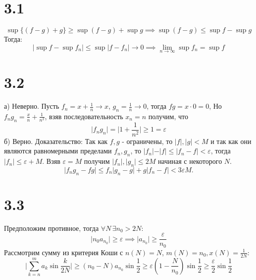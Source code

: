 \documentclass[12pt]{article}
\begin{document}
\section{3.1}
\[
    \sup \{(f - g) + g\} \geq \sup (f - g) + \sup g \implies \sup (f - g) \leq \sup f - \sup g
\]  
Тогда: 
\[
    \vert \sup f - \sup f_n \vert \leq \sup \vert f - f_n \vert \to 0 \implies \lim_{n \to \infty} \sup f_n = \sup f
\] 


\section{3.2}
а) Неверно. Пусть $f_n = x + \frac{1}{n} \to x$, $g_n = \frac{1}{n} \to 0$, тогда $f g = x \cdot 0 = 0$, 
Но $f_n g_n = \frac{x}{n} + \frac{1}{n^2}$, взяв последовательность $x_n = n$ получим, что 
\[
    \vert f_n g_n \vert = \vert 1 + \frac{1}{n^2} \vert \geq 1 = \varepsilon   
\]     
б) Верно. Доказательство: 
Так как $f, g$ - ограничены, то $\vert f \vert, \vert g \vert < M$ и так как они являются равномерными 
пределами $f_n, g_n$, то $\vert f_n \vert - \vert f \vert \leq \vert f_n - f \vert < \varepsilon$, тогда 
$\vert f_n \vert \leq \varepsilon + M$. Взяв $\varepsilon = M$ получим $\vert f_n \vert, \vert g_n \vert \leq 2M$ начиная с 
некоторого $N$.
\[
    \vert f_n g_n - f g \vert \leq f_n \vert g_n - g \vert + g \vert f_n - f \vert < 3 \varepsilon M.  
\]
\section{3.3}
Предположим противное, тогда $\forall N \, \exists n_0 > 2 N$: 
\[
    \vert n_0 a_{n_0} \vert \geq \varepsilon \implies \vert a_{n_0} \vert \geq \frac{\varepsilon}{n_0} 
\]
Рассмотрим сумму из критерия Коши с $n(N) = N$, $m(N) = n_0, x(N) = \frac{1}{2N}$: 
\[
    \vert \sum_{k=n}^{m} a_k \sin \frac{k}{2N} \vert \geq (n_0 - N) a_{n_0} \sin \frac{1}{2} \geq 
    \varepsilon \left( 1 - \frac{N}{n_0} \right) \sin \frac{1}{2} \geq \frac{\varepsilon}{2} \sin \frac{1}{2}
\]  
\end{document}
